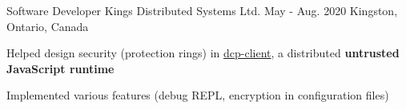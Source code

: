 \begin{cventries}
  \cventry
    {Software Developer} %
    {Kings Distributed Systems Ltd.} %
    {May - Aug. 2020} %
    {Kingston, Ontario, Canada} %
    {
      \begin{cvitems} %
        \item{Helped design security (protection rings) in \href{https://www.npmjs.com/package/dcp-client}{dcp-client}, a distributed \textbf{untrusted JavaScript runtime}}
        \item{Implemented various features (debug REPL, encryption in configuration files)} %
      \end{cvitems}
    }


\end{cventries}
